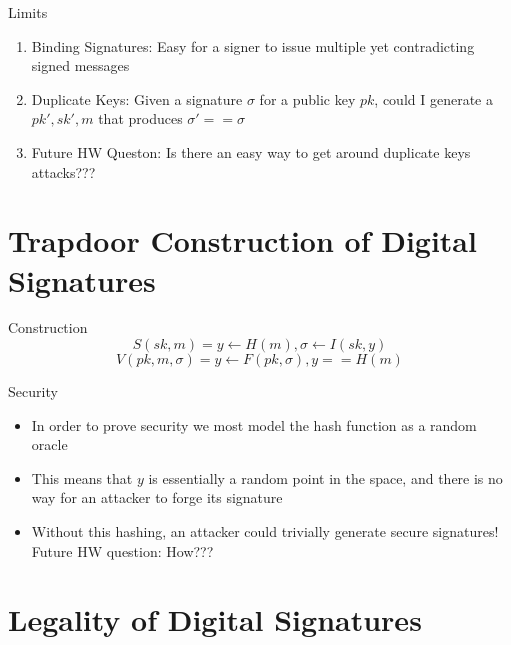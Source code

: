 \documentclass[handout]{beamer}
\begin{document}
\begin{frame}{Limits}
    \begin{enumerate}
        \item \pause Binding Signatures: Easy for a signer to issue multiple yet contradicting signed messages
        \item \pause Duplicate Keys: Given a signature \(\sigma\) for a public key \(pk\), could I generate a \(pk', sk', m\) that produces \(\sigma' == \sigma\)
        \item \pause Future HW Queston: Is there an easy way to get around duplicate keys attacks???
    \end{enumerate}
\end{frame}

\section{Trapdoor Construction of Digital Signatures}

\begin{frame}{Construction}
    \pause
    \[S(sk, m) = y \leftarrow H(m), \sigma \leftarrow I(sk, y)\]
    \pause
    \[V(pk, m, \sigma) = y \leftarrow F(pk, \sigma), y == H(m)\]
\end{frame}

\begin{frame}{Security}
    \begin{itemize}
        \item \pause In order to prove security we most model the hash function as a random oracle
        \item \pause This means that \(y\) is essentially a random point in the space, and there is no way for an attacker to forge its signature
        \item \pause Without this hashing, an attacker could trivially generate secure signatures! Future HW question: How???
    \end{itemize}
\end{frame}

\section{Legality of Digital Signatures}
\end{document}
